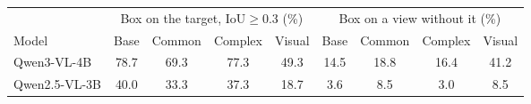 \begin{tabular}{@{}lcccccccc@{}}
\toprule
& \multicolumn{4}{c}{Box on the target, IoU${\ge}0.3$ (\%)} & \multicolumn{4}{c}{Box on a view without it (\%)}\\
\cmidrule(lr){2-5}\cmidrule(l){6-9}
Model & Base & Common & Complex & Visual & Base & Common & Complex & Visual\\
\midrule
Qwen3-VL-4B & 78.7 & 69.3 & 77.3 & 49.3 & 14.5 & 18.8 & 16.4 & 41.2\\
Qwen2.5-VL-3B & 40.0 & 33.3 & 37.3 & 18.7 & 3.6 & 8.5 & 3.0 & 8.5\\
\bottomrule
\end{tabular}
